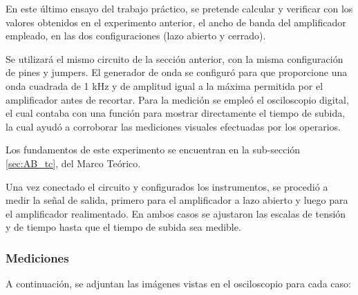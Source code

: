 
En este último ensayo del trabajo práctico, se pretende calcular y verificar con los valores obtenidos en el experimento anterior, el ancho de banda del amplificador empleado, en las dos configuraciones (lazo abierto y cerrado). 

Se utilizará el mismo circuito de la sección anterior, con la misma configuración de pines y jumpers. El generador de onda se configuró para que proporcione una onda cuadrada de 1 kHz y de amplitud igual a la máxima permitida por el amplificador antes de recortar. Para la medición se empleó el osciloscopio digital, el cual contaba con una función para mostrar directamente el tiempo de subida, la cual ayudó a corroborar las mediciones visuales efectuadas por los operarios. 

Los fundamentos de este experimento se encuentran en la sub-sección \ref{sec:AB_tc}, del Marco Teórico.

Una vez conectado el circuito y configurados los instrumentos, se procedió a medir la señal de salida, primero para el amplificador a lazo abierto y luego para el amplificador realimentado. En ambos casos se ajustaron las escalas de tensión y de tiempo hasta que el tiempo de subida sea medible. 

\subsubsection{Mediciones}

A continuación, se adjuntan las imágenes vistas en el osciloscopio para cada caso:

